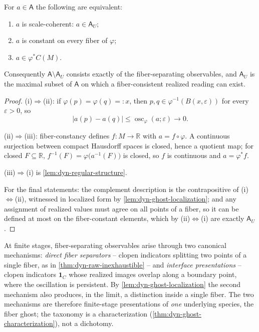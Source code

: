 \begin{theorem}
	\label{thm:dyn-ghost-characterization}
	For \(a\in\mathsf A\) the following are equivalent:
	\begin{enumerate}[label=\textup{(\roman*)}]
		\item \(a\) is scale-coherent: \(a\in\mathsf A_U\);
		\item \(a\) is constant on every fiber of \(\varphi\);
		\item \(a\in\varphi^*C(M)\).
	\end{enumerate}
	Consequently
	\(\mathsf A\setminus\mathsf A_U\) consists exactly of the
	fiber-separating observables, and \(\mathsf A_U\) is the maximal
	subset of \(\mathsf A\) on which a fiber-consistent realized
	reading can exist.
\end{theorem}
\begin{proof}
	\textup{(i)}\(\Rightarrow\)\textup{(ii)}:
	if \(\varphi(p)=\varphi(q)=:x\), then
	\(p,q\in\varphi^{-1}(B(x,\varepsilon))\) for every
	\(\varepsilon>0\), so
	\[
		|a(p)-a(q)|
		\le\operatorname{osc}_\varphi(a;\varepsilon)\to0.
	\]

	\textup{(ii)}\(\Rightarrow\)\textup{(iii)}:
	fiber-constancy defines \(f:M\to\mathbb R\) with
	\(a=f\circ\varphi\). A continuous surjection between compact
	Hausdorff spaces is closed, hence a quotient map; for closed
	\(F\subseteq\mathbb R\),
	\(f^{-1}(F)=\varphi\bigl(a^{-1}(F)\bigr)\) is closed, so \(f\) is
	continuous and \(a=\varphi^*f\).

	\textup{(iii)}\(\Rightarrow\)\textup{(i)} is
	\cref{lem:dyn-regular-structure}.

	For the final statements: the complement description is the
	contrapositive of
	\textup{(i)}\(\Leftrightarrow\)\textup{(ii)}, witnessed in
	localized form by \cref{lem:dyn-ghost-localization}; and any
	assignment of realized values must agree on all points of a fiber,
	so it can be defined at most on the fiber-constant elements, which
	by \textup{(ii)}\(\Leftrightarrow\)\textup{(i)} are exactly
	\(\mathsf A_U\).
\end{proof}

\begin{remark}
	\label{rem:dyn-ghost-presentations}
	At finite stages, fiber-separating observables arise through two
	canonical mechanisms: \emph{direct fiber separators} -- clopen
	indicators splitting two points of a single fiber, as in
	\cref{thm:dyn-raw-inexhaustible} -- and \emph{interface
		presentations} -- clopen indicators \(\mathbf 1_C\) whose realized
	images overlap along a boundary point, where the oscillation is
	persistent. By \cref{lem:dyn-ghost-localization} the second
	mechanism also produces, in the limit, a distinction inside a
	single fiber. The two mechanisms are therefore finite-stage
	presentations of \emph{one} underlying species, the fiber ghost;
	the taxonomy is a characterization
	(\cref{thm:dyn-ghost-characterization}), not a dichotomy.
\end{remark}

